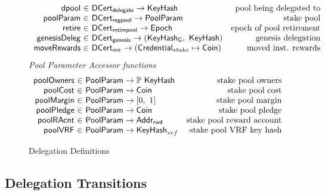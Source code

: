 \begin{figure}[htb]
\begin{equation*}
\begin{array}{r@{~\in~}lr}
      \fun{dpool} & \DCertDeleg \to \KeyHash
                                            & \text{pool being delegated to}
      \\
      \fun{poolParam} & \DCertRegPool \to \PoolParam
                                            & \text{stake pool}
      \\
      \fun{retire} & \DCertRetirePool \to \Epoch
                                            & \text{epoch of pool retirement}
      \\
      \fun{genesisDeleg} & \DCertGen \to (\KeyHashGen,~\KeyHash)
                                            & \text{genesis delegation}
      \\
      \fun{moveRewards} & \DCertMir \to (\StakeCredential \mapsto \Coin)
                                            & \text{moved inst. rewards}
    \end{array}
  \end{equation*}
  \emph{Pool Parameter Accessor functions}
  \begin{equation*}
  \begin{array}{r@{~\in~}lr}
    \fun{poolOwners} & \PoolParam \to \powerset{\KeyHash}
                     & \text{stake pool owners}
    \\
    \fun{poolCost} & \PoolParam \to \Coin
                     & \text{stake pool cost}
    \\
    \fun{poolMargin} & \PoolParam \to \unitInterval
                     & \text{stake pool margin}
    \\
    \fun{poolPledge} & \PoolParam \to \Coin
                     & \text{stake pool pledge}
    \\
    \fun{poolRAcnt} & \PoolParam \to \AddrRWD
                     & \text{stake pool reward account}
    \\
    \fun{poolVRF} & \PoolParam \to \KeyHash_{vrf}
                  & \text{stake pool VRF key hash}
    \\
  \end{array}
  \end{equation*}

  \caption{Delegation Definitions}
  \label{fig:delegation-defs}
\end{figure}

\clearpage

\subsection{Delegation Transitions}
\label{sec:deleg-trans}



